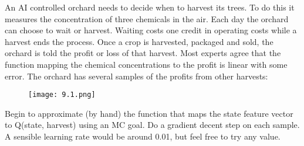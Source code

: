 
\begin{exercise}

\phantom{}

An AI controlled orchard needs to decide when to harvest its trees. To do this it measures the concentration
of three chemicals in the air. Each day the orchard can choose to wait or harvest. Waiting costs one credit in
operating costs while a harvest ends the process. Once a crop is harvested, packaged and sold, the orchard is
told the profit or loss of that harvest. Most experts agree that the function mapping the chemical concentrations
to the profit is linear with some error. The orchard has several samples of the profits from other harvests:

\begin{figure}[H]
    \centering
    \texttt{[image: 9.1.png]}
\end{figure}

Begin to approximate (by hand) the function that maps the state feature vector to Q(state, harvest) using an
MC goal. Do a gradient decent step on each sample. A sensible learning rate would be around 0.01, but feel
free to try any value.
\end{exercise}


\begin{solution}

\phantom{}

\end{solution}

